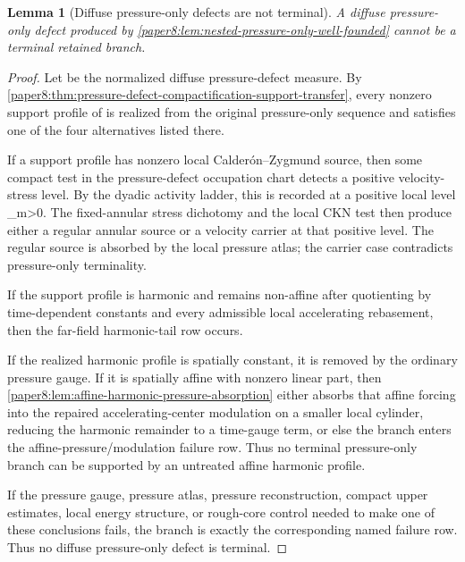 \documentclass[11pt]{amsart}
\def\({}%
\def\){}%
\theoremstyle{plain}
\newtheorem{lemma}[lemma]{Lemma}
\theoremstyle{definition}
\theoremstyle{remark}
\begin{document}
\begin{lemma}[Diffuse pressure-only defects are not terminal]
\label{paper8:lem:diffuse-pressure-only-not-terminal}
A diffuse pressure-only defect produced by
\cref{paper8:lem:nested-pressure-only-well-founded} cannot be a terminal
retained branch.
\end{lemma}

\begin{proof}
Let \(\pi\) be the normalized diffuse pressure-defect measure.  By
\cref{paper8:thm:pressure-defect-compactification-support-transfer}, every
nonzero support profile of \(\pi\) is realized from the original pressure-only
sequence and satisfies one of the four alternatives listed there.

If a support profile has nonzero local Calder\'on--Zygmund source, then
some compact test in the pressure-defect occupation chart detects a positive
velocity-stress level.  By the dyadic activity ladder, this is recorded at a
positive local level \(\eta_m>0\).  The fixed-annular stress dichotomy and the
local CKN test then produce either a regular annular source or a velocity
carrier at that positive level.  The regular source is absorbed by the local
pressure atlas; the carrier case contradicts pressure-only terminality.

If the support profile is harmonic and remains non-affine after quotienting by
time-dependent constants and every admissible local accelerating rebasement,
then the far-field harmonic-tail row occurs.

If the realized harmonic profile is spatially constant, it is removed by the
ordinary pressure gauge.  If it is spatially affine with nonzero linear part,
then \cref{paper8:lem:affine-harmonic-pressure-absorption} either absorbs that
affine forcing into the repaired accelerating-center modulation on a smaller
local cylinder, reducing the harmonic remainder to a time-gauge term, or else
the branch enters the affine-pressure/modulation failure row.  Thus no terminal
pressure-only branch can be supported by an untreated affine harmonic profile.

If the pressure gauge, pressure atlas, pressure reconstruction, compact upper
estimates, local energy structure, or rough-core control needed to make one of
these conclusions fails, the branch is exactly the corresponding named failure
row.  Thus no diffuse pressure-only defect is terminal.
\end{proof}
\end{document}
